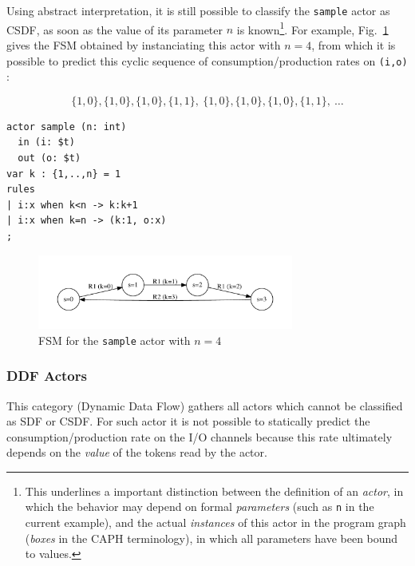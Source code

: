 Using abstract interpretation, it is still possible to classify the \verb|sample| actor as CSDF, as
soon as the value of its parameter $n$ is known\footnote{This underlines a important distinction
  between the definition of an \emph{actor}, in which the behavior may depend on formal
  \emph{parameters} (such as \texttt{n} in the current example), and the actual \emph{instances} of
  this actor in the program graph (\emph{boxes} in the CAPH terminology), in which all parameters
  have been bound to values.}. For example, Fig.~\ref{fig:cpn-ex3b} gives the FSM obtained by
instanciating this actor with $n=4$, from which it is possible to predict this cyclic sequence of
consumption/production rates on \verb|(i,o)| : 

\begin{equation*}
  \{1,0\}, \{1,0\}, \{1,0\}, \{1,1\},\ \{1,0\}, \{1,0\}, \{1,0\}, \{1,1\},\ \ldots
\end{equation*}

\begin{lstlisting}[caption={A $n \rightarrow 1$ subsampling actor},label={lst:cpn-ex3}]
actor sample (n: int)
  in (i: $t)
  out (o: $t)
var k : {1,..,n} = 1
rules
| i:x when k<n -> k:k+1
| i:x when k=n -> (k:1, o:x)
;
\end{lstlisting}

\begin{figure}[h]
  \centering
  \includegraphics[width=0.75\textwidth]{figs/sample4-act}
  \caption{FSM for the \texttt{sample} actor with $n=4$}
  \label{fig:cpn-ex3b}
\end{figure}

\subsubsection{DDF Actors}
\label{sec:ddf-actors}

This category (Dynamic Data Flow) gathers all actors which cannot be classified as SDF or CSDF. 
For such actor it is not possible to statically predict the consumption/production rate on the I/O
channels because this rate ultimately depends on the \emph{value} of the tokens read by the actor. 

